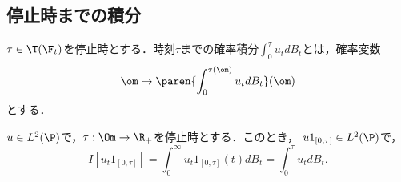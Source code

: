 \documentclass[uplatex,dvipdfmx]{jsreport}
\begin{document}
\subsection{停止時までの積分}

\begin{definition}[停止時までの積分]
    $\tau\in\T(\F_t)$を停止時とする．時刻$\tau$までの確率積分$\int^\tau_0u_tdB_t$とは，確率変数
    \[\om\mapsto\paren{\int^{\tau(\om)}_0u_tdB_t}(\om)\]
    とする．
\end{definition}

\begin{proposition}\label{prop-integral-until-stopping}
    $u\in L^2(\P)$で，$\tau:\Om\to\R_+$を停止時とする．このとき，
    $u1_{[0,\tau]}\in L^2(\P)$で，
    \[I[u_t1_{[0,\tau]}]=\int^\infty_0u_t1_{[0,\tau]}(t)dB_t=\int^\tau_0u_tdB_t.\]
\end{proposition}
\end{document}
